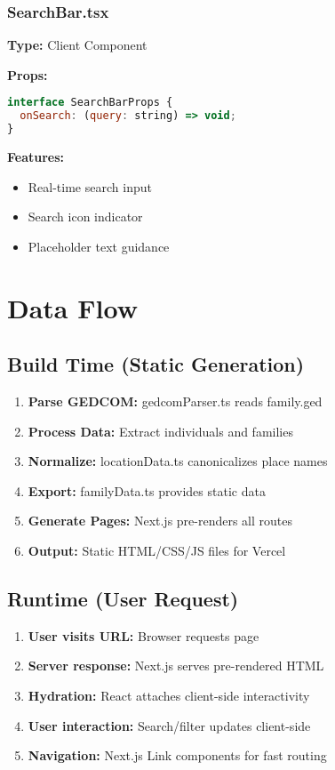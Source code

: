 \documentclass[11pt]{article}
\begin{document}
\subsubsection{SearchBar.tsx}
\textbf{Type:} Client Component

\textbf{Props:}
\begin{lstlisting}[language=JavaScript, basicstyle=\small\ttfamily]
interface SearchBarProps {
  onSearch: (query: string) => void;
}
\end{lstlisting}

\textbf{Features:}
\begin{itemize}
    \item Real-time search input
    \item Search icon indicator
    \item Placeholder text guidance
\end{itemize}

\section{Data Flow}

\subsection{Build Time (Static Generation)}

\begin{enumerate}
    \item \textbf{Parse GEDCOM:} gedcomParser.ts reads family.ged
    \item \textbf{Process Data:} Extract individuals and families
    \item \textbf{Normalize:} locationData.ts canonicalizes place names
    \item \textbf{Export:} familyData.ts provides static data
    \item \textbf{Generate Pages:} Next.js pre-renders all routes
    \item \textbf{Output:} Static HTML/CSS/JS files for Vercel
\end{enumerate}

\subsection{Runtime (User Request)}

\begin{enumerate}
    \item \textbf{User visits URL:} Browser requests page
    \item \textbf{Server response:} Next.js serves pre-rendered HTML
    \item \textbf{Hydration:} React attaches client-side interactivity
    \item \textbf{User interaction:} Search/filter updates client-side
    \item \textbf{Navigation:} Next.js Link components for fast routing
\end{enumerate}
\end{document}
